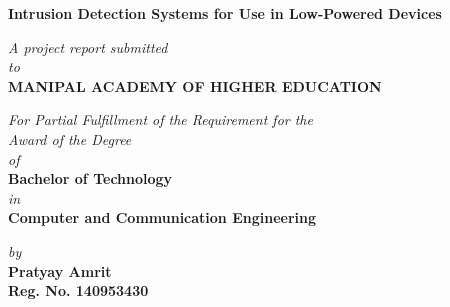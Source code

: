 \documentclass[runningheads,a4paper,12pt]{report}
\begin{document}


\begin{titlepage}
	\begin{center}
	\large{\textbf{Intrusion Detection Systems for Use in Low-Powered Devices}}
	\end{center}

	\begin{center}
	\small{\textit{A project report submitted} \\ \textit{to} \\\textbf{MANIPAL ACADEMY OF HIGHER EDUCATION} \\}
	\end{center}


	\vspace{-0.5cm}
	\begin{center}
	\small{\textit{For Partial Fulfillment of the Requirement for the\\ Award of the Degree\\of}} \\
	\textbf{Bachelor of Technology} \\ \textit{in} \\ \textbf{Computer and Communication Engineering}
	\end{center}

	\begin{center}
	\small{\textit{by}} \\
	\textbf{Pratyay Amrit} \\ \textbf{Reg. No. 140953430} \\
	\end{center}


\end{titlepage}
\end{document}
